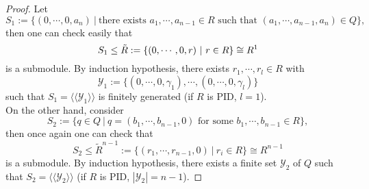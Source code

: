 \documentclass[11pt,openany]{book}
\theoremstyle{plain}
\theoremstyle{definition}
\theoremstyle{remark}
\begin{document}
\begin{proof}
    Let
    $$S_1:=\{(0,\cdots,0,a_n)\ |\ \text{there exists }a_1,\cdots,a_{n-1}\in R\text{ such that }(a_1,\cdots,a_{n-1},a_n)\in Q\},$$
    then one can check easily that
    $$S_1\leq\Tilde{R}:=\{(0,\cdots,0,r)\ |\ r\in R\}\cong R^1$$
    is a submodule. By induction hypothesis, there exists $r_1,\cdots,r_l\in R$ with
    $$\mathcal{Y}_1:=\{(0,\cdots,0,\gamma_1),\cdots,(0,\cdots,0,\gamma_l)\}$$
    such that $S_1=\langle\langle\mathcal{Y}_1\rangle\rangle$ is finitely generated (if $R$ is PID, $l=1$).\\
    On the other hand, consider
    $$S_2:=\{q\in Q\ |\ q=(b_1,\cdots,b_{n-1},0)\text{ for some }b_1,\cdots,b_{n-1}\in R\},$$
    then once again one can check that
    $$S_2\leq\widetilde{R}^{n-1}:=\{(r_1,\cdots,r_{n-1},0)\ |\ r_i\in R\}\cong R^{n-1}$$
    is a submodule. By induction hypothesis, there exists a finite set $\mathcal{Y}_2$ of $Q$ such that $S_2=\langle\langle\mathcal{Y}_2\rangle\rangle$ (if $R$ is PID, $|\mathcal{Y}_2|=n-1$).


\end{proof}
\end{document}
